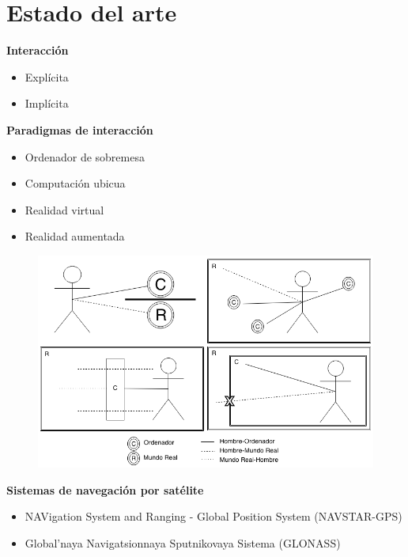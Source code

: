 \section{Estado del arte}

\begin{slide}
  \begin{block}{\textbf{Interacción}}
    \begin{itemize}
      \item Explícita
      \item Implícita
    \end{itemize}
  \end{block}
  \begin{block}{\textbf{Paradigmas de interacción}}
    \begin{itemize}
      \item Ordenador de sobremesa
      \item Computación ubicua
      \item Realidad virtual
      \item Realidad aumentada
    \end{itemize}
  \end{block}
\end{slide}

\begin{slide}
  \begin{figure}[!h]
    \begin{center}
      \includegraphics[height=0.8\textheight]{img/paradigmas.png}
    \end{center}
  \end{figure}
\end{slide}

\begin{slide}
  \begin{block}{\textbf{Sistemas de navegación por satélite}}
    \begin{itemize}
      \item NAVigation System and Ranging - Global Position System (NAVSTAR-GPS)
      \item Global’naya Navigatsionnaya Sputnikovaya Sistema (GLONASS)
    \end{itemize}
  \end{block}
\end{slide}

